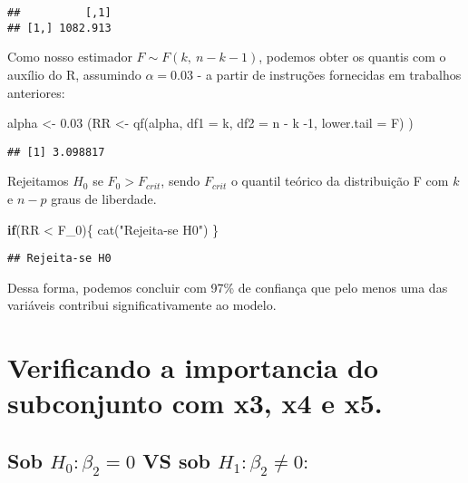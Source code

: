 \documentclass[
]{article}
\newenvironment{Shaded}{\begin{snugshade}}{\end{snugshade}}
\newcommand{\AttributeTok}[1]{\textcolor[rgb]{0.77,0.63,0.00}{#1}}
\newcommand{\ControlFlowTok}[1]{\textcolor[rgb]{0.13,0.29,0.53}{\textbf{#1}}}
\newcommand{\DecValTok}[1]{\textcolor[rgb]{0.00,0.00,0.81}{#1}}
\newcommand{\FloatTok}[1]{\textcolor[rgb]{0.00,0.00,0.81}{#1}}
\newcommand{\FunctionTok}[1]{\textcolor[rgb]{0.00,0.00,0.00}{#1}}
\newcommand{\NormalTok}[1]{#1}
\newcommand{\OtherTok}[1]{\textcolor[rgb]{0.56,0.35,0.01}{#1}}
\newcommand{\SpecialCharTok}[1]{\textcolor[rgb]{0.00,0.00,0.00}{#1}}
\newcommand{\StringTok}[1]{\textcolor[rgb]{0.31,0.60,0.02}{#1}}
\begin{document}
\begin{verbatim}
##          [,1]
## [1,] 1082.913
\end{verbatim}

Como nosso estimador \(F \sim F(k,\ n - k - 1)\), podemos obter os
quantis com o auxílio do R, assumindo \(\alpha = 0.03\) - a partir de
instruções fornecidas em trabalhos anteriores:

\begin{Shaded}
\begin{Highlighting}[]
\NormalTok{alpha }\OtherTok{\textless{}{-}} \FloatTok{0.03}
\NormalTok{(RR }\OtherTok{\textless{}{-}} \FunctionTok{qf}\NormalTok{(alpha, }\AttributeTok{df1 =}\NormalTok{ k, }\AttributeTok{df2 =}\NormalTok{ n }\SpecialCharTok{{-}}\NormalTok{ k }\SpecialCharTok{{-}}\DecValTok{1}\NormalTok{, }\AttributeTok{lower.tail =}\NormalTok{ F) )}
\end{Highlighting}
\end{Shaded}

\begin{verbatim}
## [1] 3.098817
\end{verbatim}

Rejeitamos \(H_0\) se \(F_0 > F_{crit}\), sendo \(F_{crit}\) o quantil
teórico da distribuição F com \(k\) e \(n-p\) graus de liberdade.

\begin{Shaded}
\begin{Highlighting}[]
\ControlFlowTok{if}\NormalTok{(RR }\SpecialCharTok{\textless{}}\NormalTok{ F\_0)\{}
  \FunctionTok{cat}\NormalTok{(}\StringTok{"Rejeita{-}se H0"}\NormalTok{)}
\NormalTok{\}}
\end{Highlighting}
\end{Shaded}

\begin{verbatim}
## Rejeita-se H0
\end{verbatim}

Dessa forma, podemos concluir com 97\% de confiança que pelo menos uma
das variáveis contribui significativamente ao modelo.

\hypertarget{verificando-a-importancia-do-subconjunto-com-x3-x4-e-x5.}{%
\section{Verificando a importancia do subconjunto com x3, x4 e
x5.}\label{verificando-a-importancia-do-subconjunto-com-x3-x4-e-x5.}}

\hypertarget{sob-h_0-ux3b2_2-0-vs-sob-h_1-ux3b2_2-neq-0}{%
\subsection{\texorpdfstring{Sob \(H_0 : β_2 = 0\) VS sob
\(H_1 : β_2 \neq 0:\)}{Sob H\_0 : β\_2 = 0 VS sob H\_1 : β\_2 \textbackslash neq 0:}}\label{sob-h_0-ux3b2_2-0-vs-sob-h_1-ux3b2_2-neq-0}}
\end{document}

